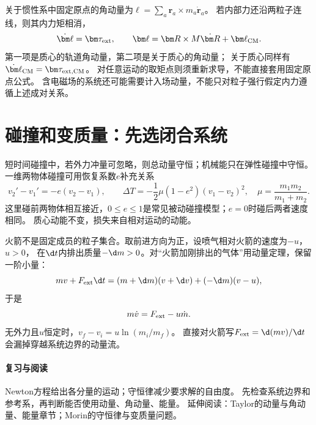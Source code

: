 关于惯性系中固定原点的角动量为$\bm\ell=\sum_a\bm r_a\times m_a\dot{\bm r}_a$。
若内部力还沿两粒子连线，则其内力矩相消，
\begin{equation}
 \dot{\bm\ell}=\bm\tau_{\rm ext},\qquad
 \bm\ell=\bm R\times M\dot{\bm R}+\bm\ell_{\rm CM}.
\end{equation}
第一项是质心的轨道角动量，第二项是关于质心的角动量；
关于质心同样有$\dot{\bm\ell}_{\rm CM}=\bm\tau_{{\rm ext},\rm CM}$。
对任意运动的取矩点则须重新求导，不能直接套用固定原点公式。
含电磁场的系统还可能需要计入场动量，不能只对粒子强行假定内力遵循上述成对关系。

\section{碰撞和变质量：先选闭合系统}
短时间碰撞中，若外力冲量可忽略，则总动量守恒；机械能只在弹性碰撞中守恒。
一维两物体碰撞可用恢复系数$e$补充关系
\begin{equation}
 v_2'-v_1'=-e(v_2-v_1),\qquad
 \Delta T=-\frac12\mu(1-e^2)(v_1-v_2)^2,
 \quad \mu=\frac{m_1m_2}{m_1+m_2}.
\end{equation}
这里碰前两物体相互接近，$0\leq e\leq1$是常见被动碰撞模型；$e=0$时碰后两者速度相同。
质心动能不变，损失来自相对运动的动能。

火箭不是固定成员的粒子集合。取前进方向为正，设喷气相对火箭的速度为$-u$，$u>0$，
在$\d t$内排出质量$-\d m>0$。对“火箭加刚排出的气体”用动量定理，保留一阶小量：
\begin{equation}
 mv+F_{\rm ext}\d t=(m+\d m)(v+\d v)+(-\d m)(v-u),
\end{equation}
于是
\begin{equation}
 m\dot v=F_{\rm ext}-u\dot m.
\end{equation}
无外力且$u$恒定时，$v_f-v_i=u\ln(m_i/m_f)$。
直接对火箭写$F_{\rm ext}=\d(mv)/\d t$会漏掉穿越系统边界的动量流。

\paragraph{复习与阅读}
Newton方程给出各分量的运动；守恒律减少要求解的自由度。
先检查系统边界和参考系，再判断能否使用动量、角动量、能量。
延伸阅读：Taylor的动量与角动量、能量章节；Morin的守恒律与变质量问题。
